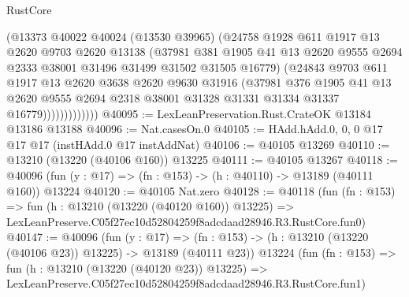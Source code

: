 \begin{lexlean}{RustCore}
\begin{coremodule}
                      (@13373
                        @40022
                        @40024
                        (@13530 @39965)
                        (@24758
                          @1928
                          @611
                          @1917
                          @13
                          @2620
                          @9703
                          @2620
                          @13138
                          (@37981
                            @381
                            @1905
                            @41
                            @13
                            @2620
                            @9555
                            @2694
                            @2333
                            @38001
                            @31496
                            @31499
                            @31502
                            @31505
                            @16779)
                          (@24843
                            @9703
                            @611
                            @1917
                            @13
                            @2620
                            @3638
                            @2620
                            @9630
                            @31916
                            (@37981
                              @376
                              @1905
                              @41
                              @13
                              @2620
                              @9555
                              @2694
                              @2318
                              @38001
                              @31328
                              @31331
                              @31334
                              @31337
                              @16779)))))))))))))
@40095 := LexLeanPreservation.Rust.CrateOK @13184 @13186 @13188
@40096 := Nat.casesOn.{0}
@40105 := HAdd.hAdd.{0, 0, 0} @17 @17 @17 (instHAdd.{0} @17 instAddNat)
@40106 := @40105 @13269
@40110 := @13210 (@13220 (@40106 @160)) @13225
@40111 := @40105 @13267
@40118 := @40096 (fun (y : @17) => (fn : @153) -> (h : @40110) -> @13189 (@40111 @160)) @13224
@40120 := @40105 Nat.zero
@40128 := @40118
    (fun (fn : @153) =>
    fun (h : @13210 (@13220 (@40120 @160)) @13225) =>
    LexLeanPreserve.C05f27ec10d52804259f8adcdaad28946.R3.RustCore.fun0)
@40147 := @40096
    (fun (y : @17) =>
    (fn : @153) -> (h : @13210 (@13220 (@40106 @23)) @13225) -> @13189 (@40111 @23))
    @13224
    (fun (fn : @153) =>
    fun (h : @13210 (@13220 (@40120 @23)) @13225) =>
    LexLeanPreserve.C05f27ec10d52804259f8adcdaad28946.R3.RustCore.fun1)

\end{coremodule}
\end{lexlean}
